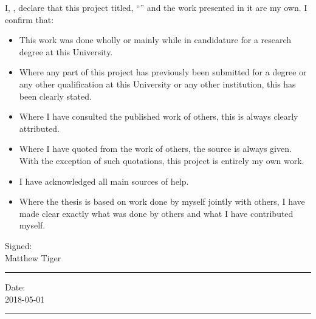 \documentclass[
11pt, %
english, %
singlespacing, %
headsepline, %
]{MastersDoctoralThesis} %
\begin{document}

\begin{declaration}
\addchaptertocentry{\authorshipname} %
\noindent I, \authorname, declare that this project titled, \enquote{\ttitle} and the work presented in it are my own. I confirm that:

\begin{itemize}
\item This work was done wholly or mainly while in candidature for a research degree at this University.
\item Where any part of this project has previously been submitted for a degree or any other qualification at this University or any other institution, this has been clearly stated.
\item Where I have consulted the published work of others, this is always clearly attributed.
\item Where I have quoted from the work of others, the source is always given. With the exception of such quotations, this project is entirely my own work.
\item I have acknowledged all main sources of help.
\item Where the thesis is based on work done by myself jointly with others, I have made clear exactly what was done by others and what I have contributed myself.\\
\end{itemize}

\noindent Signed: \\
Matthew Tiger\\
\rule[0.5em]{25em}{0.5pt} %

\noindent Date: \\
2018-05-01\\
\rule[0.5em]{25em}{0.5pt} %
\end{declaration}

\cleardoublepage


\end{document}

